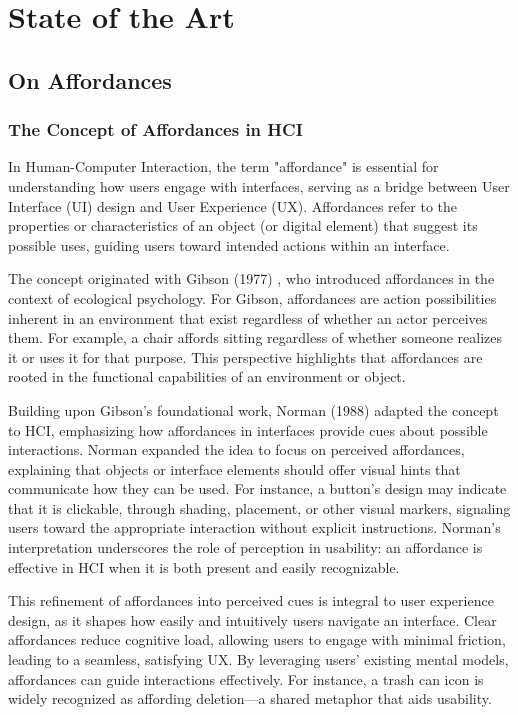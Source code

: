 \section{State of the Art}

\subsection{On Affordances}

\subsubsection{The Concept of Affordances in HCI}

In Human-Computer Interaction, the term "affordance" is essential for understanding how users engage with interfaces, serving as a bridge between User Interface (UI) design and User Experience (UX).
Affordances refer to the properties or characteristics of an object (or digital element) that suggest its possible uses, guiding users toward intended actions within an interface.

The concept originated with Gibson (1977) \cite{gibson1977theory}, who introduced affordances in the context of ecological psychology.
For Gibson, affordances are action possibilities inherent in an environment that exist regardless of whether an actor perceives them.
For example, a chair affords sitting regardless of whether someone realizes it or uses it for that purpose.
This perspective highlights that affordances are rooted in the functional capabilities of an environment or object.

Building upon Gibson's foundational work, Norman (1988) \cite{norman1988psychology} adapted the concept to HCI, emphasizing how affordances in interfaces provide cues about possible interactions.
Norman expanded the idea to focus on perceived affordances, explaining that objects or interface elements should offer visual hints that communicate how they can be used.
For instance, a button's design may indicate that it is clickable, through shading, placement, or other visual markers, signaling users toward the appropriate interaction without explicit instructions.
Norman’s interpretation underscores the role of perception in usability: an affordance is effective in HCI when it is both present and easily recognizable.

This refinement of affordances into perceived cues is integral to user experience design, as it shapes how easily and intuitively users navigate an interface.
Clear affordances reduce cognitive load, allowing users to engage with minimal friction, leading to a seamless, satisfying UX.
By leveraging users' existing mental models, affordances can guide interactions effectively.
For instance, a trash can icon is widely recognized as affording deletion—a shared metaphor that aids usability.


